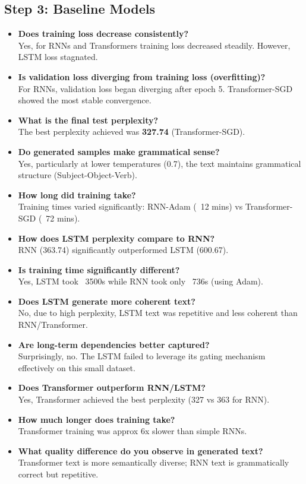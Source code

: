 \documentclass[12pt,a4paper]{article}
\begin{document}
\subsection*{Step 3: Baseline Models}
\begin{itemize}
    \item \textbf{Does training loss decrease consistently?} \\ Yes, for RNNs and Transformers training loss decreased steadily. However, LSTM loss stagnated.
    \item \textbf{Is validation loss diverging from training loss (overfitting)?} \\ For RNNs, validation loss began diverging after epoch 5. Transformer-SGD showed the most stable convergence.
    \item \textbf{What is the final test perplexity?} \\ The best perplexity achieved was \textbf{327.74} (Transformer-SGD).
    \item \textbf{Do generated samples make grammatical sense?} \\ Yes, particularly at lower temperatures (0.7), the text maintains grammatical structure (Subject-Object-Verb).
    \item \textbf{How long did training take?} \\ Training times varied significantly: RNN-Adam (~12 mins) vs Transformer-SGD (~72 mins).
    \item \textbf{How does LSTM perplexity compare to RNN?} \\ RNN (363.74) significantly outperformed LSTM (600.67).
    \item \textbf{Is training time significantly different?} \\ Yes, LSTM took ~3500s while RNN took only ~736s (using Adam).
    \item \textbf{Does LSTM generate more coherent text?} \\ No, due to high perplexity, LSTM text was repetitive and less coherent than RNN/Transformer.
    \item \textbf{Are long-term dependencies better captured?} \\ Surprisingly, no. The LSTM failed to leverage its gating mechanism effectively on this small dataset.
    \item \textbf{Does Transformer outperform RNN/LSTM?} \\ Yes, Transformer achieved the best perplexity (327 vs 363 for RNN).
    \item \textbf{How much longer does training take?} \\ Transformer training was approx 6x slower than simple RNNs.
    \item \textbf{What quality difference do you observe in generated text?} \\ Transformer text is more semantically diverse; RNN text is grammatically correct but repetitive.
\end{itemize}
\end{document}
